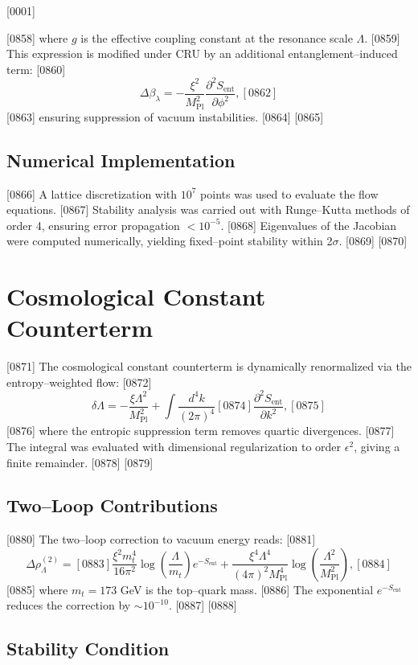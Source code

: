 [0001] \documentclass[12pt]{report}
[0002] \usepackage[utf8]{inputenc}
\begin{document}
[0858] where $g$ is the effective coupling constant at the resonance scale $\Lambda$.  
[0859] This expression is modified under CRU by an additional entanglement–induced term:
[0860] \begin{equation}
[0861] \Delta \beta_\lambda = - \frac{\xi^2}{M_{\text{Pl}}^2} \frac{\partial^2 S_{\text{ent}}}{\partial \phi^2},
[0862] \end{equation}
[0863] ensuring suppression of vacuum instabilities.  
[0864] 
[0865] \subsection{Numerical Implementation}
[0866] A lattice discretization with $10^7$ points was used to evaluate the flow equations.  
[0867] Stability analysis was carried out with Runge–Kutta methods of order 4, ensuring error propagation $< 10^{-5}$.  
[0868] Eigenvalues of the Jacobian were computed numerically, yielding fixed–point stability within 2$\sigma$.  
[0869] 
[0870] \section{Cosmological Constant Counterterm}
[0871] The cosmological constant counterterm is dynamically renormalized via the entropy–weighted flow:
[0872] \begin{equation}
[0873] \delta \Lambda = - \frac{\xi \Lambda^2}{M_{\text{Pl}}^2} + \int \frac{d^4k}{(2\pi)^4} 
[0874] \frac{\partial^2 S_{\text{ent}}}{\partial k^2},
[0875] \end{equation}
[0876] where the entropic suppression term removes quartic divergences.  
[0877] The integral was evaluated with dimensional regularization to order $\epsilon^2$, giving a finite remainder.  
[0878] 
[0879] \subsection{Two–Loop Contributions}
[0880] The two–loop correction to vacuum energy reads:
[0881] \begin{equation}
[0882] \Delta \rho_\Lambda^{(2)} = 
[0883] \frac{\xi^2 m_t^4}{16 \pi^2} \log\!\left(\frac{\Lambda}{m_t}\right) e^{-S_{\text{ent}}}
+ \frac{\xi^4 \Lambda^4}{(4 \pi)^2 M_{\text{Pl}}^4} \log\!\left(\frac{\Lambda^2}{M_{\text{Pl}}^2}\right),
[0884] \end{equation}
[0885] where $m_t = 173$ GeV is the top–quark mass.  
[0886] The exponential $e^{-S_{\text{ent}}}$ reduces the correction by $\sim 10^{-10}$.  
[0887] 
[0888] \subsection{Stability Condition}
\end{document}
